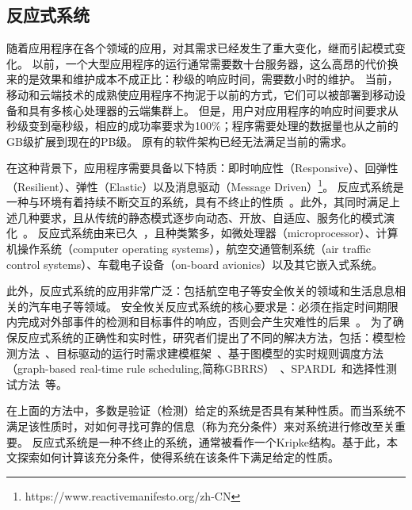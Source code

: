 \subsection{反应式系统}
随着应用程序在各个领域的应用，对其需求已经发生了重大变化，继而引起模式变化。
以前，一个大型应用程序的运行通常需要数十台服务器，这么高昂的代价换来的是效果和维护成本不成正比：秒级的响应时间，需要数小时的维护。
当前，移动和云端技术的成熟使应用程序不拘泥于以前的方式，它们可以被部署到移动设备和具有多核心处理器的云端集群上。
但是，用户对应用程序的响应时间要求从秒级变到毫秒级，相应的成功率要求为100\%；程序需要处理的数据量也从之前的GB级扩展到现在的PB级。
原有的软件架构已经无法满足当前的需求。

在这种背景下，应用程序需要具备以下特质：即时响应性（Responsive）、回弹性（Resilient）、弹性（Elastic）以及消息驱动（Message Driven）\footnote{https://www.reactivemanifesto.org/zh-CN}。
反应式系统是一种与环境有着持续不断交互的系统，具有不终止的性质~\cite{DBLP:series/txtcs/Schneider04}。此外，其同时满足上述几种要求，且从传统的静态模式逐步向动态、开放、自适应、服务化的模式演化~\cite{jian2012}。
反应式系统由来已久~\cite{DBLP:conf/nato/HarelP84,DBLP:books/sp/trends86/Pnueli86}，且种类繁多，如微处理器（microprocessor）、计算机操作系统（computer operating systems），航空交通管制系统（air traffic control systems）、车载电子设备（on-board avionics）以及其它嵌入式系统。

此外，反应式系统的应用非常广泛：包括航空电子等安全攸关的领域和生活息息相关的汽车电子等领域。
安全攸关反应式系统的核心要求是：必须在指定时间期限内完成对外部事件的检测和目标事件的响应，否则会产生灾难性的后果~\cite{wangjuan2019}。
为了确保反应式系统的正确性和实时性，研究者们提出了不同的解决方法，包括：模型检测方法~\cite{DBLP:books/daglib/0007403,clarke1996model,DBLP:series/txtcs/Schneider04}、目标驱动的运行时需求建模框架~\cite{jian2012}、基于图模型的实时规则调度方法（graph-based real-time rule scheduling,简称GBRRS）~\cite{wangjuan2019}、SPARDL~\cite{wangzhen2012}和选择性测试方法~\cite{lishu2004}等。

在上面的方法中，多数是验证（检测）给定的系统是否具有某种性质。而当系统不满足该性质时，对如何寻找可靠的信息（称为充分条件）来对系统进行修改至关重要。
反应式系统是一种不终止的系统，通常被看作一个Kripke结构。基于此，本文探索如何计算该充分条件，使得系统在该条件下满足给定的性质。




